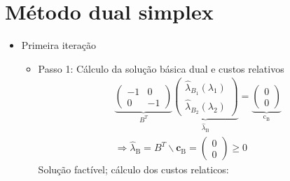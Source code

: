                                                                                                                                                                                                                                                                                                                                                                                                                                                                                                                                                                                                                                                                                                                                                                                                                                                                                                                                                                                                                                                                                                                                                                                                                                                                                                                                                                                                                                                                                                                                                                                                                                                                                                                                                                                                                                                                                                                                                                                                                                                                                                                                                                                                                                                                                                                                                                                                                                                                                                                                                                                                                                                                                                                                                                                                                                                                                                                                                                                                                                                                                                                                                                                                                                                                                                                                                                                                                                                                                                                                                                                                                                                                                                                                                                                                                                                                                                                                                                                                                                                                                                                                                                                                                                                                                                                                                                                                                                                                                                                                                                                                                                                                                                                                                                                                                                                                                                                                                                                                                                                                                                                                                                                                                                                                                                                                                                                                                                                                                                                                                                                                                                                                                                                                                                                                                                                                                                                                                                                                                                                                                                                                                                                                                                                                                                                                                                                                                                                                                                                                                                                                                                                                                                                                                                                                                                                                                                                                                                                                                                                                                                                                                                                                                                                                                                                                                                                                                                          \documentclass[a4paper, 12pt]{article}
\begin{document}
\section{Método dual simplex}
\begin{itemize}
\item Primeira iteração
\begin{itemize}
\item Passo 1: Cálculo da solução básica dual e custos relativos
$$
\begin{gathered}
\underbrace{\left(\begin{array}{cc}
-1 & 0 \\
0 & -1
\end{array}\right)}_{B^{T}} \underbrace{\left(\begin{array}{l}
\hat{\lambda}_{B_{1}}\left(\lambda_{1}\right) \\
\hat{\lambda}_{B_{2}}\left(\lambda_{2}\right)
\end{array}\right)}_{\hat{\lambda}_{\mathrm{B}}}=\underbrace{\left(\begin{array}{l}
0 \\
0
\end{array}\right)}_{\mathrm{c}_{\mathrm{B}}} \\
\Rightarrow \hat{\lambda}_{\mathrm{B}}=B^{T} \backslash \mathbf{c}_{\mathrm{B}}=\left(\begin{array}{l}
0 \\
0
\end{array}\right) \geq 0
\end{gathered}
$$
Solução factível; cálculo dos custos relaticos: 


\end{itemize}
\end{itemize}
\end{document}
